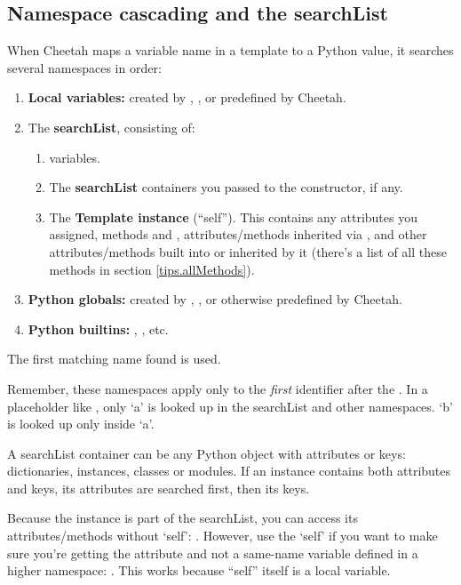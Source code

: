\subsection{Namespace cascading and the searchList}
\label{language.searchList}

When Cheetah maps a variable name in a template to a Python value, it searches
several namespaces in order:

\begin{enumerate}
\item {\bf Local variables:} created by ,
    , or predefined by Cheetah.
\item The {\bf searchList}, consisting of:
    \begin{enumerate}
    \item {} variables.
    \item The {\bf searchList} containers you passed to the  
        constructor, if any.
    \item The {\bf Template instance} (``self'').  This contains any attributes
        you assigned,  methods and ,
        attributes/methods inherited via , and other
        attributes/methods built into  or inherited by it
        (there's a list of all these methods in section
        \ref{tips.allMethods}).
    \end{enumerate}
\item {\bf Python globals:} created by ,
    , or otherwise predefined by Cheetah.
\item {\bf Python builtins:}  , , etc.
\end{enumerate}

The first matching name found is used.  

Remember, these namespaces apply only to the {\em first} identifier after the
\code{\$}.  In a placeholder like , only `a' is looked up in the
searchList and other namespaces.  `b' is looked up only inside `a'.

A searchList container can be any Python object with attributes or keys:
dictionaries, instances, classes or modules.  If an instance contains both
attributes and keys, its attributes are searched first, then its keys.

Because the  instance is part of the searchList, you can
access its attributes/methods without `self': .  However, use
the `self' if you want to make sure you're getting the 
attribute and not a same-name variable defined in a higher namespace:
.  This works because ``self'' itself is a local variable.

